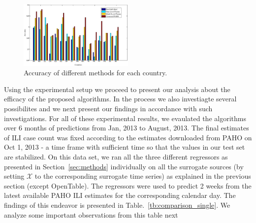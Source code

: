 
\begin{figure}[h]
\centering
\includegraphics[width=0.5\textwidth]{fig/accs.eps}
\caption{Accuracy of different methods for each country.}
\label{fig:accuracies}
\end{figure}

Using the experimental setup we proceed to present our analysis about the efficacy 
of the proposed algorithms. In the process we also investiagte several possibilites 
and we next present our findings in accordance with such investigations. For all of 
these experimental results, we evaulated the algorithms over 6 months of predictions 
from Jan, 2013 to August, 2013. The final estimates of ILI case count was fixed according
to the estimates downloaded from PAHO on Oct 1, 2013 - a time frame with sufficient time
so that the values in our test set are stabilized. On this data set, we ran all the three different 
regressors as presented in Section~\ref{sec:methods} individually on all the surrogate sources (by setting
$\mathcal{X}$ to the corresponding surrogate time series)
as explained in the previous section (except OpenTable). The regressors were used to predict
2 weeks from the latest available PAHO ILI estimates for the corresponding calendar day. 
The findings of this endeavor is presented in Table.~\ref{tb:comparison_single}. We analyze 
some important observations from this table next


